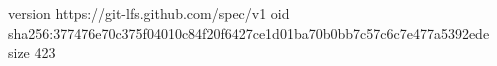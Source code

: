 version https://git-lfs.github.com/spec/v1
oid sha256:377476e70c375f04010c84f20f6427ce1d01ba70b0bb7c57c6c7e477a5392ede
size 423
